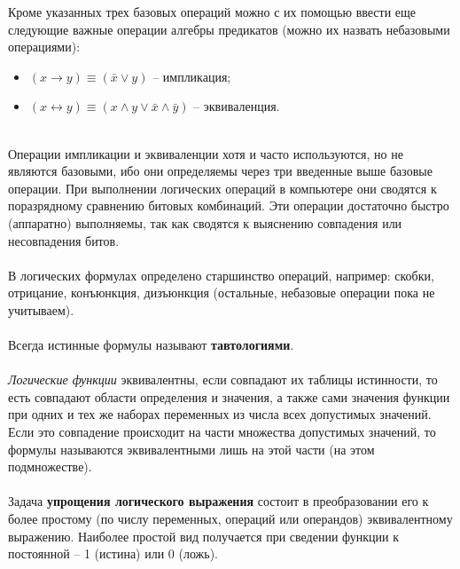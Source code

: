 Кроме указанных трех базовых операций можно с их помощью ввести еще следующие важные операции алгебры предикатов (можно их назвать небазовыми операциями):\\
\begin{itemize}
\item$(x\to y) \equiv (\bar{x} \vee y)$ -- импликация; \\
\item$(x\leftrightarrow y) \equiv (x \wedge y \vee \bar{x} \wedge \bar{y})$ -- эквиваленция.
\end{itemize}\\
Операции импликации и эквиваленции хотя и часто используются, но не являются базовыми, ибо они определяемы через три введенные выше базовые операции. При выполнении логических операций в компьютере они сводятся к поразрядному сравнению битовых комбинаций. Эти операции достаточно быстро (аппаратно) выполняемы, так как сводятся к выяснению совпадения или несовпадения битов.\\
\\В логических формулах определено старшинство операций, например: скобки, отрицание, конъюнкция, дизъюнкция (остальные, небазовые операции пока не учитываем).\\
\\Всегда истинные формулы называют \textbf{тавтологиями}.\\
\\\emph{Логические функции} эквивалентны, если совпадают их таблицы истинности, то есть совпадают области определения и значения, а также сами значения функции при одних и тех же наборах переменных из числа всех допустимых значений. Если это совпадение происходит на части множества допустимых значений, то формулы называются эквивалентными лишь на этой части (на этом подмножестве).\\
\\Задача \textbf{упрощения логического выражения} состоит в преобразовании его к более простому (по числу переменных, операций или операндов) эквивалентному выражению. Наиболее простой вид получается при сведении функции к постоянной – 1 (истина) или 0 (ложь).


